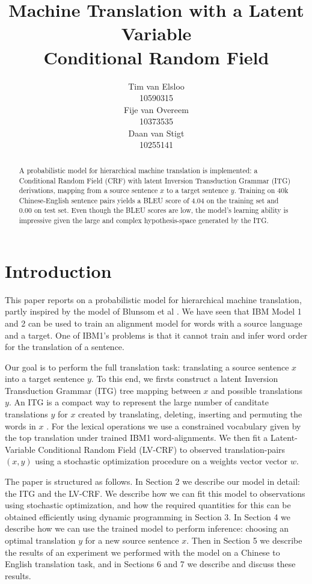 \documentclass[11pt,a4paper]{article}
\title{Machine Translation with a Latent Variable \\ Conditional Random Field}%
\author{Tim van Elsloo \\
 10590315\\\And
  Fije van Overeem \\
  10373535 \\\And 
  Daan van Stigt \\
  10255141    }
\date{}
\begin{document}
\maketitle
\begin{abstract}
A probabilistic model for hierarchical machine translation is implemented: a Conditional Random Field (CRF) with latent Inversion Transduction Grammar (ITG) derivations, mapping from a source sentence $x$ to a target sentence $y$. Training on 40k Chinese-English sentence pairs yields a BLEU score of 4.04 on the training set and 0.00 on test set. Even though the BLEU scores are low, the model's learning ability is impressive given the large and complex hypothesis-space generated by the ITG.
\end{abstract}

\section{Introduction}

This paper reports on a probabilistic model for hierarchical machine translation, partly inspired by the model of Blunsom et al \cite{blunsom2008discriminative}. We have seen that IBM Model 1 and 2 can be used to train an alignment model for words with a source language and a target. One of IBM1's problems is that it cannot train and infer word order for the translation of a sentence.

Our goal is to perform the full translation task: translating a source sentence $x$ into a target sentence $y$. To this end, we firsts construct a latent Inversion Transduction Grammar (ITG) tree mapping between $x$ and possible translations $y$. An ITG is a compact way to represent the large number of canditate translations $y$ for $x$ created by translating, deleting, inserting and permuting the words in $x$ \cite{wu97}. For the lexical operations we use a constrained vocabulary given by the top translation under trained IBM1 word-alignments. We then fit a Latent-Variable Conditional Random Field (LV-CRF) to observed translation-pairs $(x,y)$ using a stochastic optimization procedure on a weights vector vector $w$. 

The paper is structured as follows. In Section 2 we describe our model in detail: the ITG and the LV-CRF. We describe how we can fit this model to observations using stochastic optimization, and how the required quantities for this can be obtained efficiently using dynamic programming in Section 3. In Section 4 we describe how we can use the trained model to perform inference: choosing an optimal translation $y$ for a new source sentence $x$. Then in Section 5 we describe the results of an experiment we performed with the model on a Chinese to English translation task, and in Sections 6 and 7 we describe and discuss these results.
\end{document}
